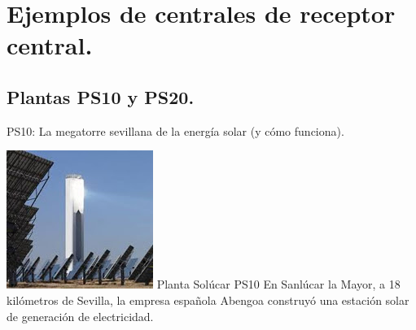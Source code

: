 \documentclass[12pt]{article}
\begin{document}
\section{Ejemplos de centrales de receptor central.}
\subsection{Plantas PS10 y PS20.}

PS10: La megatorre sevillana de la energía solar (y cómo funciona).

\includegraphics[width=\textwidth]{unnamed (4).jpg}
Planta Solúcar PS10
En Sanlúcar la Mayor, a 18 kilómetros de Sevilla, la empresa española Abengoa construyó una estación solar de generación de electricidad.
\end{document}
